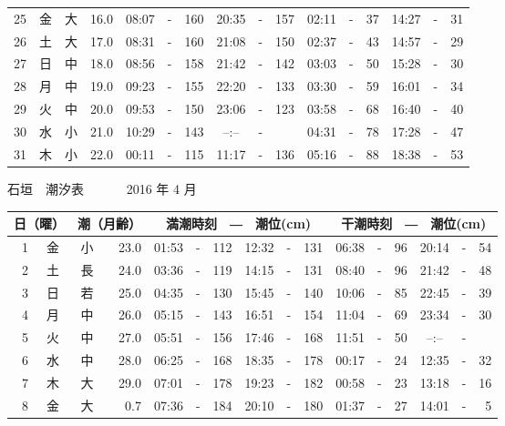 \documentclass[12pt.a4j]{jsarticle}
\begin{document}
\begin{center}
\begin{table}[ht]
\begin{tabular}{|rc|cr|ccrccr|ccrccr|}
25 & 金 & 大 & 16.0 &  08:07 &-& 160  &  20:35 &-& 157  &   02:11 &-&  37  &   14:27 &-&  31  \\
26 & 土 & 大 & 17.0 &  08:31 &-& 160  &  21:08 &-& 150  &   02:37 &-&  43  &   14:57 &-&  29  \\
27 & 日 & 中 & 18.0 &  08:56 &-& 158  &  21:42 &-& 142  &   03:03 &-&  50  &   15:28 &-&  30  \\
28 & 月 & 中 & 19.0 &  09:23 &-& 155  &  22:20 &-& 133  &   03:30 &-&  59  &   16:01 &-&  34  \\
29 & 火 & 中 & 20.0 &  09:53 &-& 150  &  23:06 &-& 123  &   03:58 &-&  68  &   16:40 &-&  40  \\
30 & 水 & 小 & 21.0 &  10:29 &-& 143  &  --:-- &-&     &   04:31 &-&  78  &   17:28 &-&  47  \\
31 & 木 & 小 & 22.0 &  00:11 &-& 115  &  11:17 &-& 136  &   05:16 &-&  88  &   18:38 &-&  53  \\
   \hline
   \end{tabular}
\end{table}
\newpage
 {\LARGE 石垣　潮汐表　　　}
 {\large 2016 年  4 月}\\
 \begin{table}[ht]
    \begin{tabular}{|rc|cr|ccrccr|ccrccr|}
    \hline
    \multicolumn{2}{|c|}{日（曜）} & \multicolumn{2}{c|}{潮（月齢）} & \multicolumn{6}{c|}{満潮時刻　―　潮位(cm)} & \multicolumn{6}{c|}{干潮時刻　―　潮位(cm)} \\
 \hline
 1 & 金 & 小 & 23.0 &  01:53 &-& 112  &  12:32 &-& 131  &   06:38 &-&  96  &   20:14 &-&  54  \\
 2 & 土 & 長 & 24.0 &  03:36 &-& 119  &  14:15 &-& 131  &   08:40 &-&  96  &   21:42 &-&  48  \\
 3 & 日 & 若 & 25.0 &  04:35 &-& 130  &  15:45 &-& 140  &   10:06 &-&  85  &   22:45 &-&  39  \\
 4 & 月 & 中 & 26.0 &  05:15 &-& 143  &  16:51 &-& 154  &   11:04 &-&  69  &   23:34 &-&  30  \\
 5 & 火 & 中 & 27.0 &  05:51 &-& 156  &  17:46 &-& 168  &   11:51 &-&  50  &   --:-- &-&     \\
 6 & 水 & 中 & 28.0 &  06:25 &-& 168  &  18:35 &-& 178  &   00:17 &-&  24  &   12:35 &-&  32  \\
 7 & 木 & 大 & 29.0 &  07:01 &-& 178  &  19:23 &-& 182  &   00:58 &-&  23  &   13:18 &-&  16  \\
 8 & 金 & 大 &  0.7 &  07:36 &-& 184  &  20:10 &-& 180  &   01:37 &-&  27  &   14:01 &-&   5  \\

\end{tabular}
\end{table}
\end{center}
\end{document}
